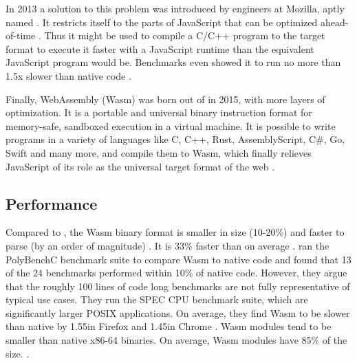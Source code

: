 In 2013 a solution to this problem was introduced by engineers at Mozilla, aptly named . It restricts itself to the parts of JavaScript that can be optimized ahead-of-time \cite{Herman2014}. Thus it might be used to compile a C/C++ program to the  target format to execute it faster with a JavaScript runtime than the equivalent JavaScript program would be. Benchmarks even showed it to run no more than 1.5x slower than native code \cite{Zakai2013}.

Finally, WebAssembly (Wasm) was born out of  in 2015, with more layers of optimization. It is a portable and universal binary instruction format for memory-safe, sandboxed execution in a virtual machine.
It is possible to write programs in a variety of languages like C, C++, Rust, AssemblyScript, C\#, Go, Swift and many more, and compile them to Wasm, which finally relieves JavaScript of its role as the universal target format of the web \cite{W3C2020}.


\subsection{Performance}

Compared to , the Wasm binary format is smaller in size (10-20\%) and faster to parse (by an order of magnitude)
\cite{Clark2019}. It is 33\% faster than  on average \cite{Haas2017}.
\citeauthor{NotSoFast} ran the PolyBenchC benchmark suite to compare Wasm to native code and found that 13 of the 24 benchmarks performed within 10\% of native code. However, they argue that the roughly 100 lines of code long benchmarks are not fully representative of typical use cases. They run the SPEC CPU benchmark suite, which are significantly larger POSIX applications. On average, they find Wasm to be slower than native by 1.55\times in Firefox and 1.45\times in Chrome \cite{NotSoFast}.
Wasm modules tend to be smaller than native x86-64 binaries. On average, Wasm modules have 85\% of the size.
\cite{Haas2017}.




